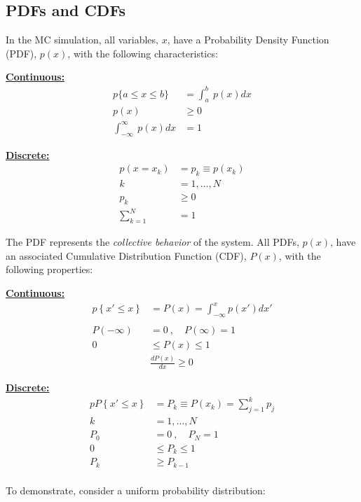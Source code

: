 \documentclass[12pt]{article}
\begin{document}
\subsection*{PDFs and CDFs}

In the MC simulation, all variables, $x$, have a Probability Density Function (PDF), $p(x)$, with the following characteristics:

\textbf{\underline{Continuous:}}
\begin{align*}
  p\{a \le x \le b\} &= \int_a^b \: p(x)dx \\
  p(x) &\ge 0 \\
  \int_{-\infty}^{\infty} \: p(x)dx &=1
\end{align*}

\textbf{\underline{Discrete:}}
\begin{align*}
  p(x = x_k) &= p_k \equiv p(x_k) \\
  k &= 1, \dots, N \\
  p_k &\ge 0 \\
  \sum_{k=1}^N &= 1
\end{align*}

The PDF represents the \textit{collective behavior} of the system.  
All PDFs, $p(x)$, have an associated Cumulative Distribution Function (CDF), $P(x)$, with the following properties:

\textbf{\underline{Continuous:}}
\begin{align*}
  p\left\lbrace x' \leq x \right\rbrace &= P(x) = \int_{-\infty}^x p(x')dx'\\
  & \\
  P(-\infty) &= 0 \:,\quad P(\infty) = 1 \\
  0 &\leq P(x) \leq 1 \\
  &\frac{dP(x)}{dx} \geq 0
\end{align*}

\textbf{\underline{Discrete:}}
\begin{align*}
  pP\left\lbrace x' \leq x \right\rbrace &= P_k \equiv P(x_k) = \sum_{j=1}^k p_j\\
  k &= 1, \dots, N \\
  P_0 &= 0 \:,\quad P_N = 1 \\
  0 &\leq P_k \leq 1 \\
  P_k & \geq P_{k-1} \\
\end{align*}

To demonstrate, consider a uniform probability distribution:
\end{document}

